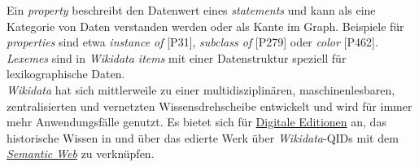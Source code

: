 \documentclass{article}
\begin{document}
        Ein \emph{property} beschreibt den Datenwert eines \emph{statements} und kann als eine Kategorie von Daten verstanden
                  werden oder als Kante im Graph. Beispiele für \emph{properties}
                  sind etwa \emph{instance of} [P31], \emph{subclass
                     of} [P279] oder \emph{color} [P462].\\
            
        \emph{Lexemes} sind in \emph{Wikidata items} mit
                  einer Datenstruktur speziell für lexikographische Daten. \\
            
        \emph{Wikidata} hat sich mittlerweile zu einer multidisziplinären,
                  maschinenlesbaren, zentralisierten und vernetzten Wissensdrehscheibe entwickelt
                  und wird für immer mehr Anwendungsfälle genutzt. Es bietet sich für \href{http://gams.uni-graz.at/o:konde.59}{Digitale Editionen} an, das
                  historische Wissen in und über das edierte Werk über \emph{Wikidata}-QIDs mit dem \emph{\href{http://gams.uni-graz.at/o:konde.167}{Semantic Web}} zu verknüpfen.\\
            
\end{document}
